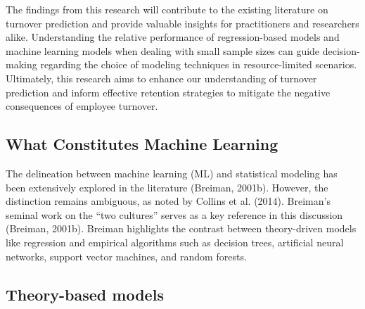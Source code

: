 \documentclass[
  man]{apa7}
\begin{document}
The findings from this research will contribute to the existing literature on turnover prediction and provide valuable insights for practitioners and researchers alike.
Understanding the relative performance of regression-based models and machine learning models when dealing with small sample sizes can guide decision-making regarding the choice of modeling techniques in resource-limited scenarios.
Ultimately, this research aims to enhance our understanding of turnover prediction and inform effective retention strategies to mitigate the negative consequences of employee turnover.

\hypertarget{what-constitutes-machine-learning}{%
\subsection{What Constitutes Machine Learning}\label{what-constitutes-machine-learning}}

The delineation between machine learning (ML) and statistical modeling has been extensively explored in the literature (Breiman, 2001b).
However, the distinction remains ambiguous, as noted by Collins et al. (2014).
Breiman's seminal work on the ``two cultures'' serves as a key reference in this discussion (Breiman, 2001b).
Breiman highlights the contrast between theory-driven models like regression and empirical algorithms such as decision trees, artificial neural networks, support vector machines, and random forests.

\hypertarget{theory-based-models}{%
\subsection{Theory-based models}\label{theory-based-models}}
\end{document}
